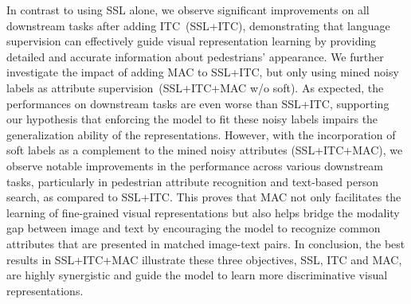 \documentclass[final]{cvpr}
\begin{document}
In contrast to using SSL alone, we observe significant improvements on all downstream tasks after adding ITC~(SSL+ITC), demonstrating that language supervision can effectively guide visual representation learning by providing detailed and accurate information about pedestrians' appearance. 
We further investigate the impact of adding MAC to SSL+ITC, but only using mined noisy labels as attribute supervision~(SSL+ITC+MAC w/o soft).
As expected, the performances on downstream tasks are even worse than SSL+ITC, supporting our hypothesis that enforcing the model to fit these noisy labels impairs the generalization ability of the representations.
However, with the incorporation of soft labels as a complement to the mined noisy attributes (SSL+ITC+MAC), we observe notable improvements in the performance across various downstream tasks, particularly in pedestrian attribute recognition and text-based person search, as compared to SSL+ITC.
This proves that MAC not only facilitates the learning of fine-grained visual representations but also helps bridge the modality gap between image and text by encouraging the model to recognize common attributes that are presented in matched image-text pairs.
In conclusion, the best results in SSL+ITC+MAC illustrate these three objectives, SSL, ITC and MAC, are highly synergistic and guide the model to learn more discriminative visual representations.

\begin{table}[t]
\small
\centering
{}\\
\caption{Performance (\%) comparisons with state-of-the-art text-based person search approaches on CUHK-PEDES. }
\label{tab7}
\vspace{-4mm}
\end{table}
\end{document}
